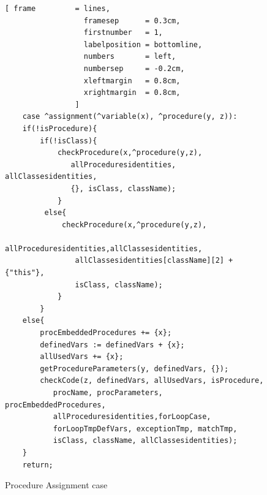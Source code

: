 \documentclass[11pt]{report}
\begin{document}
\begin{figure}[!htb]
\centering
\begin{Verbatim}[ frame         = lines, 
                  framesep      = 0.3cm, 
                  firstnumber   = 1,
                  labelposition = bottomline,
                  numbers       = left,
                  numbersep     = -0.2cm,
                  xleftmargin   = 0.8cm,
                  xrightmargin  = 0.8cm,
                ]
    case ^assignment(^variable(x), ^procedure(y, z)):
	if(!isProcedure){
		if(!isClass){
			checkProcedure(x,^procedure(y,z),
			   allProceduresidentities, allClassesidentities,
			   {}, isClass, className);
			}
		 else{
			 checkProcedure(x,^procedure(y,z),
			    allProceduresidentities,allClassesidentities,
			    allClassesidentities[className][2] + {"this"},
			    isClass, className);															   
			}
		}
	else{
		procEmbeddedProcedures += {x};
		definedVars := definedVars + {x};
		allUsedVars += {x};
		getProcedureParameters(y, definedVars, {});
		checkCode(z, definedVars, allUsedVars, isProcedure,
		   procName, procParameters, procEmbeddedProcedures,
		   allProceduresidentities,forLoopCase,
		   forLoopTmpDefVars, exceptionTmp, matchTmp, 
		   isClass, className, allClassesidentities);
	}
	return;
\end{Verbatim}
\vspace*{-0.3cm}
\caption{Procedure Assignment case}
\label{fig:procedure assignment case}
\end{figure}
\end{document}
